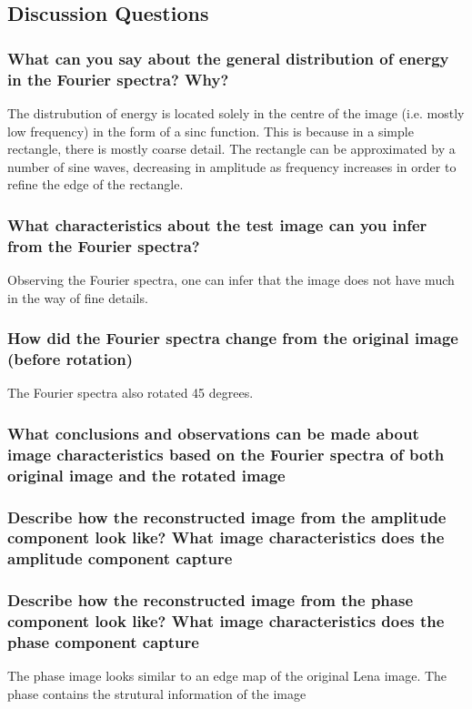 \documentclass[article, 1.5space, letterpaper, 12pt, oneside, header, footer]{SydeClass}
\begin{document}
\subsection{Discussion Questions}

\subsubsection{What can you say about the general distribution of energy in the Fourier spectra? Why?}
The distrubution of energy is located solely in the centre of the image (i.e. mostly low frequency) in the form of a sinc function. This is because in a simple rectangle, there is mostly coarse detail. The rectangle can be approximated by a number of sine waves, decreasing in amplitude as frequency increases in order to refine the edge of the rectangle.

\subsubsection{What characteristics about the test image can you infer from the Fourier spectra?}
Observing the Fourier spectra, one can infer that the image does not have much in the way of fine details.

\subsubsection{How did the Fourier spectra change from the original image (before rotation)}
The Fourier spectra also rotated 45 degrees.

\subsubsection{ What conclusions and observations can be made about image characteristics based on the Fourier
spectra of both original image and the rotated image}


\subsubsection{Describe how the reconstructed image from the amplitude component look like? What image characteristics does the amplitude component capture}



\subsubsection{Describe how the reconstructed image from the phase component look like? What image characteristics does the phase component capture}
The phase image looks similar to an edge map of the original Lena image. The phase contains the strutural information of the image
\end{document}
